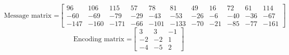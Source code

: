 \documentclass{article}
\begin{document}
$$\text{Message matrix =}
\begin{bmatrix}
96 & 106 & 115 & 57 & 78 & 81 & 49 & 16 & 72 & 61 & 114\\
-60 & -69 & -79 & -29 & -43 & -53 & -26 & -6 & -40 & -36 & -67 \\
-147 & -160 & -171 & -66 & -101 & -133 & -70 & -21 & -85 & -77 & -161
\end{bmatrix}
$$
$$\text{Encoding matrix =}
\begin{bmatrix}
3 & 3 & -1 \\
-2 & -2 & 1 \\
-4 & -5 & 2
\end{bmatrix}$$
\end{document}
